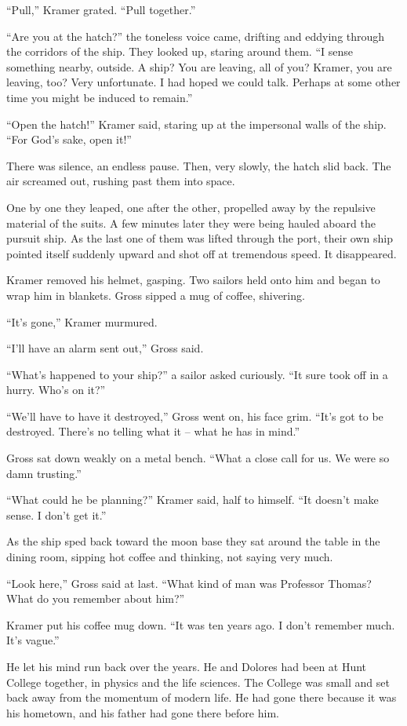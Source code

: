 \documentclass[12pt,a5paper]{book}
\newcommand{\storybreak}{%
  \par\vspace{0.6\baselineskip}
  \begin{center}\color{coveraccent}\small *\enspace *\enspace *\end{center}
  \vspace{0.3\baselineskip}\noindent\ignorespaces
}
\begin{document}
“Pull,” Kramer grated. “Pull together.”

“Are you at the hatch?” the toneless voice came, drifting and eddying through the corridors of the ship. They looked up, staring around them. “I sense something nearby, outside. A ship? You are leaving, all of you? Kramer, you are leaving, too? Very unfortunate. I had hoped we could talk. Perhaps at some other time you might be induced to remain.”

“Open the hatch!” Kramer said, staring up at the impersonal walls of the ship. “For God's sake, open it!”

There was silence, an endless pause. Then, very slowly, the hatch slid back. The air screamed out, rushing past them into space.

One by one they leaped, one after the other, propelled away by the repulsive material of the suits. A few minutes later they were being hauled aboard the pursuit ship. As the last one of them was lifted through the port, their own ship pointed itself suddenly upward and shot off at tremendous speed. It disappeared.

Kramer removed his helmet, gasping. Two sailors held onto him and began to wrap him in blankets. Gross sipped a mug of coffee, shivering.

“It's gone,” Kramer murmured.

“I'll have an alarm sent out,” Gross said.

“What's happened to your ship?” a sailor asked curiously. “It sure took off in a hurry. Who's on it?”

“We'll have to have it destroyed,” Gross went on, his face grim. “It's got to be destroyed. There's no telling what it – what he has in mind.”

Gross sat down weakly on a metal bench. “What a close call for us. We were so damn trusting.”

“What could he be planning?” Kramer said, half to himself. “It doesn't make sense. I don't get it.”

\storybreak
As the ship sped back toward the moon base they sat around the table in the dining room, sipping hot coffee and thinking, not saying very much.

“Look here,” Gross said at last. “What kind of man was Professor Thomas? What do you remember about him?”

Kramer put his coffee mug down. “It was ten years ago. I don't remember much. It's vague.”

He let his mind run back over the years. He and Dolores had been at Hunt College together, in physics and the life sciences. The College was small and set back away from the momentum of modern life. He had gone there because it was his hometown, and his father had gone there before him.
\end{document}
